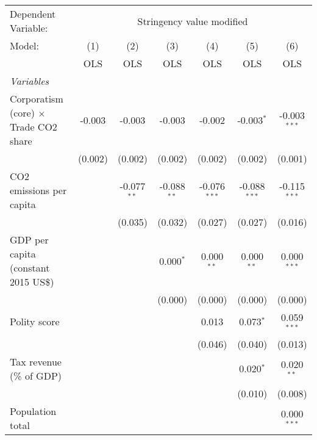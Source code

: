 
\begingroup
\centering
\begin{tabular}{lcccccc}
   \toprule
   Dependent Variable: & \multicolumn{6}{c}{Stringency value modified}\\
   Model:                                       & (1)     & (2)           & (3)           & (4)            & (5)            & (6)\\  
                                                &  OLS    & OLS           & OLS           & OLS            & OLS            & OLS\\  
   \midrule
   \emph{Variables}\\
   Corporatism (core) $\times$ Trade CO2 share  & -0.003  & -0.003        & -0.003        & -0.002         & -0.003$^{*}$   & -0.003$^{***}$\\   
                                                & (0.002) & (0.002)       & (0.002)       & (0.002)        & (0.002)        & (0.001)\\   
   CO2 emissions per capita                     &         & -0.077$^{**}$ & -0.088$^{**}$ & -0.076$^{***}$ & -0.088$^{***}$ & -0.115$^{***}$\\   
                                                &         & (0.035)       & (0.032)       & (0.027)        & (0.027)        & (0.016)\\   
   GDP per capita (constant 2015 US\$)          &         &               & 0.000$^{*}$   & 0.000$^{**}$   & 0.000$^{**}$   & 0.000$^{***}$\\   
                                                &         &               & (0.000)       & (0.000)        & (0.000)        & (0.000)\\   
   Polity score                                 &         &               &               & 0.013          & 0.073$^{*}$    & 0.059$^{***}$\\   
                                                &         &               &               & (0.046)        & (0.040)        & (0.013)\\   
   Tax revenue (\% of GDP)                      &         &               &               &                & 0.020$^{*}$    & 0.020$^{**}$\\   
                                                &         &               &               &                & (0.010)        & (0.008)\\   
   Population total                             &         &               &               &                &                & 0.000$^{***}$\\   

\end{tabular}

